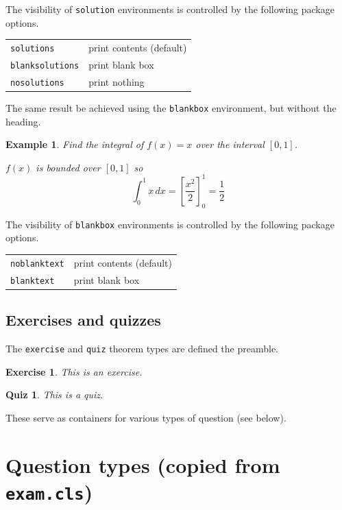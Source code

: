\documentclass{article}
\theoremstyle{break}
\newcounter{theorem}
\newtheorem{example}[theorem]{Example}
\newtheorem{exercise}[theorem]{Exercise}
\newtheorem{quiz}[theorem]{Quiz}
\begin{document}
The visibility of {\tt solution} environments is controlled by the following package options.

\bigskip
\begin{tabular}{ll}
\hline
{\tt solutions}			& print contents (default) \\
{\tt blanksolutions}	& print blank box \\
{\tt nosolutions}		& print nothing \\
\hline
\end{tabular}
\bigskip

The same result be achieved using the {\tt blankbox} environment, but without the heading.
\begin{example}
Find the integral of $f(x)=x$ over the interval $[0,1]$.
\begin{blankbox}
$f(x)$ is bounded over $[0,1]$ so 
\[
\int_0^1 x\,dx = \left[\frac{x^2}{2}\right]_0^1 = \frac{1}{2}
\]
\end{blankbox}
\end{example}

The visibility of {\tt blankbox} environments is controlled by the following package options.

\bigskip
\begin{tabular}{ll}
\hline
{\tt noblanktext}		& print contents (default) \\
{\tt blanktext}			& print blank box \\
\hline
\end{tabular}
\bigskip

\subsection{Exercises and quizzes}
The {\tt exercise} and {\tt quiz} theorem types are defined the preamble.

\begin{exercise}\label{exe:test}
This is an exercise. 
\end{exercise}

\begin{quiz}\label{quiz:test}
This is a quiz. 
\end{quiz}

These serve as containers for various types of question (see below).

\section{Question types (copied from \texttt{exam.cls})}
\end{document}
